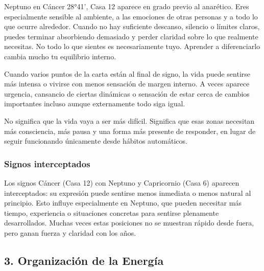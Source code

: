 \documentclass[11pt,a4paper]{article}\usepackage[utf8]{inputenc}
\begin{document}
Neptuno en Cáncer 28°41', Casa 12 aparece en grado previo al anarético. Eres especialmente sensible al ambiente, a las emociones de otras personas y a todo lo que ocurre alrededor. Cuando no hay suficiente descanso, silencio o límites claros, puedes terminar absorbiendo demasiado y perder claridad sobre lo que realmente necesitas. No todo lo que sientes es necesariamente tuyo. Aprender a diferenciarlo cambia mucho tu equilibrio interno.

Cuando varios puntos de la carta están al final de signo, la vida puede sentirse más intensa o vivirse con menos sensación de margen interno. A veces aparece urgencia, cansancio de ciertas dinámicas o sensación de estar cerca de cambios importantes incluso aunque externamente todo siga igual.

No significa que la vida vaya a ser más difícil. Significa que esas zonas necesitan más consciencia, más pausa y una forma más presente de responder, en lugar de seguir funcionando únicamente desde hábitos automáticos.


\subsubsection*{Signos interceptados}
Los signos Cáncer (Casa 12) con Neptuno y Capricornio (Casa 6) aparecen interceptados: su expresión puede sentirse menos inmediata o menos natural al principio. Esto influye especialmente en Neptuno, que pueden necesitar más tiempo, experiencia o situaciones concretas para sentirse plenamente desarrollados. Muchas veces estas posiciones no se muestran rápido desde fuera, pero ganan fuerza y claridad con los años.

\vspace{0.8cm}

\subsection{3. Organización de la Energía}
\end{document}
